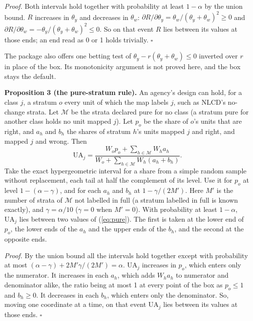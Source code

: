 \documentclass[11pt,a4paper]{article}
\begin{document}
\textit{Proof.} Both intervals hold together with probability at least $1 - \alpha$ by the union bound. $R$
increases in $\theta_y$ and decreases in $\theta_w$:
$\partial R/\partial\theta_y = \theta_w/(\theta_y + \theta_w)^2 \ge 0$ and
$\partial R/\partial\theta_w = -\theta_y/(\theta_y + \theta_w)^2 \le 0$. So on that event $R$ lies between its
values at those ends; an end read as 0 or 1 holds trivially. $\square$

The package also offers one betting test of $\theta_y - r(\theta_y + \theta_w) \le 0$ inverted over $r$ in place of
the box. Its monotonicity argument is not proved here, and the box stays the default.

\textbf{Proposition 3 (the pure-stratum rule).} An agency's design can hold, for a class $j$, a stratum $o$ every
unit of which the map labels $j$, such as NLCD's no-change strata. Let $\mathcal{M}$ be the strata declared pure for
no class (a stratum pure for another class holds no unit mapped $j$). Let $p_o$ be the share of $o$'s units that are
right, and $a_h$ and $b_h$ the shares of stratum $h$'s units mapped $j$ and right, and mapped $j$ and wrong. Then
\begin{equation}
  \mathrm{UA}_j = \frac{W_o p_o + \sum_{h \in \mathcal{M}} W_h a_h}{W_o + \sum_{h \in \mathcal{M}} W_h (a_h + b_h)}.
  \label{eq:pure}
\end{equation}
Take the exact hypergeometric interval for a share from a simple random sample without replacement, each tail at
half the complement of its level. Use it for $p_o$ at level $1 - (\alpha - \gamma)$, and for each $a_h$ and $b_h$ at
$1 - \gamma/(2M')$. Here $M'$ is the number of strata of $\mathcal{M}$ not labelled in full (a stratum labelled in
full is known exactly), and $\gamma = \alpha/10$ ($\gamma = 0$ when $M' = 0$). With probability at least
$1 - \alpha$, $\mathrm{UA}_j$ lies between two values of (\ref{eq:pure}). The first is taken at the lower end of
$p_o$, the lower ends of the $a_h$ and the upper ends of the $b_h$, and the second at the opposite ends.

\textit{Proof.} By the union bound all the intervals hold together except with probability at most
$(\alpha - \gamma) + 2M' \gamma/(2M') = \alpha$. $\mathrm{UA}_j$ increases in $p_o$, which enters only the
numerator. It increases in each $a_h$, which adds $W_h a_h$ to numerator and denominator alike, the ratio being at
most 1 at every point of the box as $p_o \le 1$ and $b_h \ge 0$. It decreases in each $b_h$, which enters only the
denominator. So, moving one coordinate at a time, on that event $\mathrm{UA}_j$ lies between its values at those
ends. $\square$
\end{document}
